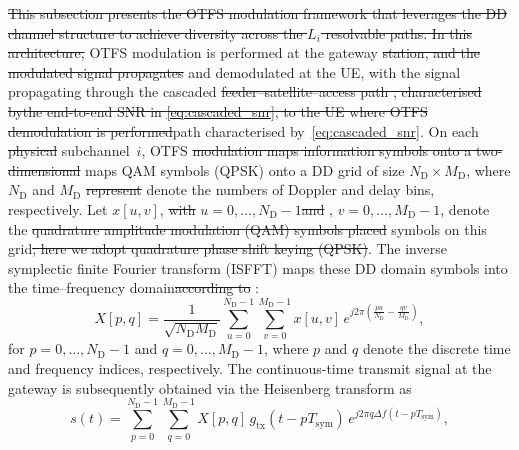 \documentclass[lettersize,journal]{IEEEtran}
\providecommand{\DIFadd}[1]{{\protect\color{blue}#1}} %
\providecommand{\DIFdel}[1]{{\protect\color{red}\sout{#1}}}                      %
\providecommand{\DIFaddbegin}{} %
\providecommand{\DIFaddend}{} %
\providecommand{\DIFdelbegin}{} %
\providecommand{\DIFdelend}{} %
\newcommand{\DIFscaledelfig}{0.5}
\newlength{\DIFdelgraphicswidth} %
\newlength{\DIFdelgraphicsheight} %
\newcommand{\DIFaddincludegraphics}[2][]{{\color{blue}\fbox{\DIFOincludegraphics[#1]{#2}}}} %
\newcommand{\DIFdelincludegraphics}[2][]{%
\sbox{\DIFdelgraphicsbox}{\DIFOincludegraphics[#1]{#2}}%
\settoboxwidth{\DIFdelgraphicswidth}{\DIFdelgraphicsbox} %
\settoboxtotalheight{\DIFdelgraphicsheight}{\DIFdelgraphicsbox} %
\scalebox{\DIFscaledelfig}{%
\parbox[b]{\DIFdelgraphicswidth}{\usebox{\DIFdelgraphicsbox}\\[-\baselineskip] \rule{\DIFdelgraphicswidth}{0em}}\llap{\resizebox{\DIFdelgraphicswidth}{\DIFdelgraphicsheight}{%
\setlength{\unitlength}{\DIFdelgraphicswidth}%
\begin{picture}(1,1)%
\thicklines\linethickness{2pt} %
{\color[rgb]{1,0,0}\put(0,0){\framebox(1,1){}}}%
{\color[rgb]{1,0,0}\put(0,0){\line( 1,1){1}}}%
{\color[rgb]{1,0,0}\put(0,1){\line(1,-1){1}}}%
\end{picture}%
}\hspace*{3pt}}} %
} %
\DeclareRobustCommand{\DIFaddbegin}{\DIFOaddbegin \let\includegraphics\DIFaddincludegraphics} %
\DeclareRobustCommand{\DIFaddend}{\DIFOaddend \let\includegraphics\DIFOincludegraphics} %
\DeclareRobustCommand{\DIFdelbegin}{\DIFOdelbegin \let\includegraphics\DIFdelincludegraphics} %
\DeclareRobustCommand{\DIFdelend}{\DIFOaddend \let\includegraphics\DIFOincludegraphics} %
\begin{document}
\DIFdelbegin \DIFdel{This subsection presents the OTFS modulation framework that leverages the DD channel structure to achieve diversity across the $L_i$ resolvable paths. In this architecture, }\DIFdelend \DIFaddbegin {\color{blue} \DIFaddend OTFS modulation is performed at the gateway \DIFdelbegin \DIFdel{station, and the modulated signal propagates }\DIFdelend \DIFaddbegin \DIFadd{and demodulated at the UE, with the signal propagating }\DIFaddend through the cascaded \DIFdelbegin \DIFdel{feeder--satellite--access path , characterised bythe end-to-end SNR in \eqref{eq:cascaded_snr}, to the UE where OTFS demodulation is performed}\DIFdelend \DIFaddbegin \DIFadd{path characterised by~\eqref{eq:cascaded_snr}}\DIFaddend . On each \DIFdelbegin \DIFdel{physical }\DIFdelend subchannel~$i$, OTFS \DIFdelbegin \DIFdel{modulation maps information symbols onto a two-dimensional }\DIFdelend \DIFaddbegin \DIFadd{maps QAM symbols (QPSK) onto a }\DIFaddend DD grid of size $N_{\mathrm{D}} \times M_{\mathrm{D}}$, where $N_{\mathrm{D}}$ and $M_{\mathrm{D}}$ \DIFdelbegin \DIFdel{represent }\DIFdelend \DIFaddbegin \DIFadd{denote }\DIFaddend the numbers of Doppler and delay bins, respectively. Let $x[u,v]$, \DIFdelbegin \DIFdel{with }\DIFdelend $u = 0,\ldots,N_{\mathrm{D}}-1$\DIFdelbegin \DIFdel{and }\DIFdelend \DIFaddbegin \DIFadd{, }\DIFaddend $v = 0,\ldots,M_{\mathrm{D}}-1$, denote the \DIFdelbegin \DIFdel{quadrature amplitude modulation (QAM) symbols placed }\DIFdelend \DIFaddbegin \DIFadd{symbols }\DIFaddend on this grid\DIFdelbegin \DIFdel{; here we adopt quadrature phase shift keying (QPSK)}\DIFdelend . The inverse symplectic finite Fourier transform (ISFFT) maps these DD domain symbols into the time--frequency domain\DIFdelbegin \DIFdel{according to
}\DIFdelend \DIFaddbegin \DIFadd{:}}
\DIFaddend \begin{equation}
X[p,q] = \frac{1}{\sqrt{N_{\mathrm{D}}M_{\mathrm{D}}}} \sum_{u=0}^{N_{\mathrm{D}}-1} \sum_{v=0}^{M_{\mathrm{D}}-1} x[u,v]\, e^{j2\pi\left(\frac{pu}{N_{\mathrm{D}}} - \frac{qv}{M_{\mathrm{D}}}\right)},
\label{eq:isfft}
\end{equation}
for $p = 0,\ldots,N_{\mathrm{D}}-1$ and $q = 0,\ldots,M_{\mathrm{D}}-1$, where $p$ and $q$ denote the discrete time and frequency indices, respectively. The continuous-time transmit signal at the gateway is subsequently obtained via the Heisenberg transform as
\begin{equation}
s(t) = \sum_{p=0}^{N_{\mathrm{D}}-1} \sum_{q=0}^{M_{\mathrm{D}}-1} X[p,q]\,g_{\mathrm{tx}}(t-pT_{\mathrm{sym}})\, e^{j2\pi q \Delta f (t-pT_{\mathrm{sym}})},
\label{eq:tx_signal}
\end{equation}
\end{document}
